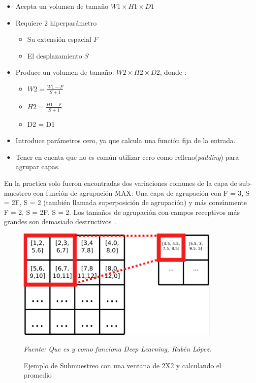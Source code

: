 \begin{itemize}
\item Acepta un volumen de tamaño $W1\times H1\times D1$
\item Requiere 2 hiperparámetro
  \begin{itemize}
  \item Su extensión espacial $F$
  \item El desplazamiento $S$
  \end{itemize}
\item Produce un volumen de tamaño: $W2\times H2\times D2$, donde :
  \begin{itemize}
  \item $W2 =  \frac{W1 - F}{S + 1}$
  \item $H2 = \frac{H1 - F}{S + 1}$
  
  \item D2 = D1
  \end{itemize}
\item Introduce parámetros cero, ya que calcula una función fija de la entrada.
\item Tener en cuenta que no es común utilizar cero como relleno(\textit{padding}) para agrupar capas.
\end{itemize}

En la practica solo fueron encontradas dos variaciones comunes de la capa de sub-muestreo con función de agrupación MAX: Una capa de agrupación con F = 3, S = 2F, S = 2 (también llamada superposición de agrupación) y más comúnmente F = 2, S = 2F, S = 2. Los tamaños de agrupación con campos receptivos más grandes son demasiado destructivos~\cite{22RedesNeuronalesConvolu}.

\begin{figure}[H]
		\centering
		\includegraphics[width=100mm]{./Imagenes/submuestre.png}
		\caption{Ejemplo de Submuestreo con una ventana de 2X2 y calculando el promedio}
		\vspace{0.15cm}
		\textit{Fuente: Que es y como funciona Deep Learning, Rubén López.}
        \label{fig:submuestre}
\end{figure}


